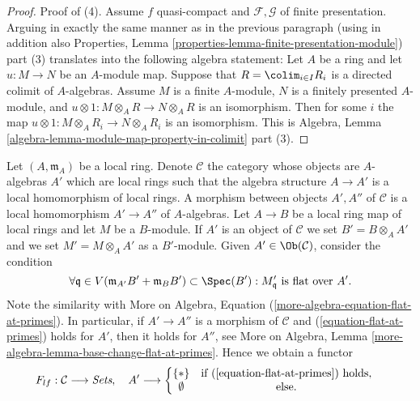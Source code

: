 \begin{proof}
\medskip\noindent
Proof of (4).
Assume $f$ quasi-compact and $\mathcal{F}, \mathcal{G}$ of finite presentation.
Arguing in exactly the same manner as in the previous paragraph
(using in addition also
Properties, Lemma \ref{properties-lemma-finite-presentation-module})
part (3) translates into the following algebra statement:
Let $A$ be a ring and let $u : M \to N$ be an $A$-module map.
Suppose that $R = \colim_{i \in I} R_i$ is a directed colimit
of $A$-algebras. Assume $M$ is a finite $A$-module, $N$ is a finitely
presented $A$-module, and
$u \otimes 1 : M \otimes_A R \to N \otimes_A R$ is an isomorphism.
Then for some $i$ the map
$u \otimes 1 : M \otimes_A R_i \to N \otimes_A R_i$ is an isomorphism.
This is
Algebra, Lemma \ref{algebra-lemma-module-map-property-in-colimit} part (3).
\end{proof}

\begin{situation}
\label{situation-flat-at-point}
Let $(A, \mathfrak m_A)$ be a local ring.
Denote $\mathcal{C}$ the category whose objects are $A$-algebras
$A'$ which are local rings such that the algebra structure
$A \to A'$ is a local homomorphism of local rings.
A morphism between objects $A', A''$ of $\mathcal{C}$ is a
local homomorphism $A' \to A''$ of $A$-algebras.
Let $A \to B$ be a local ring map of local rings and let $M$ be a $B$-module.
If $A'$ is an object of $\mathcal{C}$ we set $B' = B \otimes_A A'$
and we set $M' = M \otimes_A A'$ as a $B'$-module.
Given $A' \in \Ob(\mathcal{C})$, consider the condition
\begin{equation}
\label{equation-flat-at-primes}
\forall \mathfrak q \in V(\mathfrak m_{A'}B' + \mathfrak m_B B')
\subset \Spec(B') :
M'_{\mathfrak q}\text{ is flat over }A'.
\end{equation}
Note the similarity with
More on Algebra, Equation (\ref{more-algebra-equation-flat-at-primes}).
In particular, if $A' \to A''$ is a morphism of $\mathcal{C}$ and
(\ref{equation-flat-at-primes}) holds for $A'$, then it holds for $A''$, see
More on Algebra,
Lemma \ref{more-algebra-lemma-base-change-flat-at-primes}.
Hence we obtain a functor
\begin{equation}
\label{equation-flat-at-point}
F_{lf} : \mathcal{C} \longrightarrow \textit{Sets}, \quad
A' \longrightarrow \left\{
\begin{matrix}
\{*\} & \text{if }(\ref{equation-flat-at-primes})\text{ holds}, \\
\emptyset & \text{else.} &
\end{matrix}
\right.
\end{equation}
\end{situation}

